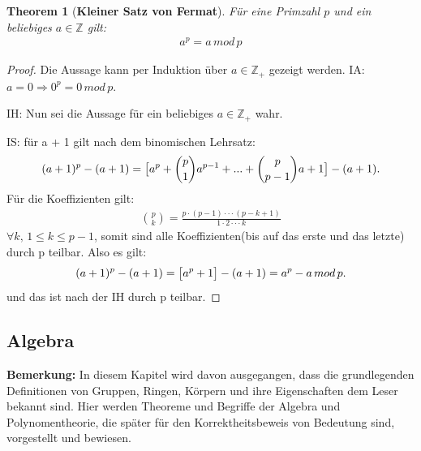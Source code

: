 \documentclass[12pt,oneside]{article}
\newtheorem{theorem}{Theorem}[section]
\theoremstyle{remark}
\theoremstyle{definition}
\begin{document}
\smallskip

\begin{theorem}[\textbf{Kleiner Satz von Fermat}]\label{Th_2}
Für eine Primzahl $p$ und ein beliebiges $a \in \mathbb{Z}$ gilt:
\begin{align*}
    a^p = a \, mod \, p
\end{align*}
\end{theorem}

\begin{proof}
Die Aussage kann per Induktion über $a \in \mathbb{Z}_{+}$ gezeigt werden.\newline\newline
IA: $a = 0  \Rightarrow 0^p = 0 \, mod \, p$.\newline\newline

IH: Nun sei die Aussage für ein beliebiges $a \in \mathbb{Z}_{+}$ wahr.\newline\newline

IS: für a + 1 gilt nach dem binomischen Lehrsatz:
\begin{align*}
    (a + 1)^p - (a + 1) = \big{[}a^p + {p \choose 1}a^{p - 1} + ... +{p \choose p - 1} a + 1\big{]} - (a + 1).
\end{align*}
Für die Koeffizienten gilt: 
\begin{align*}
    {p \choose k} = \frac{p \cdot (p - 1) \cdot \cdot \cdot (p - k + 1)}{1 \cdot 2 \cdot \cdot \cdot k}
\end{align*}
$\forall k, \,  1 \leq k \leq p - 1$, somit sind alle Koeffizienten(bis auf das erste und das letzte) durch p teilbar.\newline\newline
Also es gilt:
\begin{align*}
(a + 1)^p - (a + 1) = \big{[} a^p + 1 \big{]} - (a + 1) = a^p - a \, mod \, p.
\end{align*}
und das ist nach der IH durch p teilbar.  
\end{proof}




\subsection{Algebra}
\textbf{Bemerkung:} In diesem Kapitel wird davon ausgegangen, dass die grundlegenden Definitionen von Gruppen, Ringen, Körpern und ihre Eigenschaften dem Leser bekannt sind. Hier werden Theoreme und Begriffe der Algebra und Polynomentheorie, die später für den Korrektheitsbeweis von Bedeutung sind, vorgestellt und bewiesen.\newline
\end{document}
